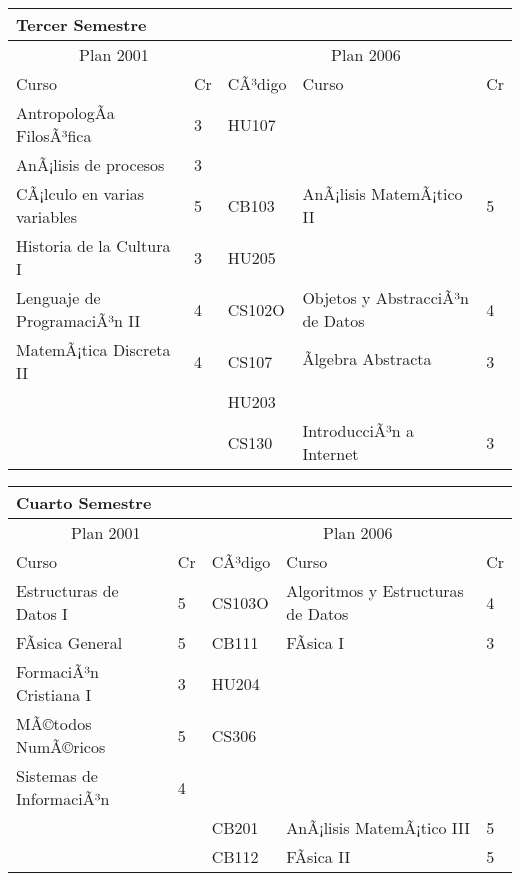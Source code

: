 \begin{center}
\begin{tabularx}{0.95\textwidth}{|p{4cm}|p{1cm}||p{2cm}|X|p{1cm}|}\hline
\multicolumn{5}{|l|}{\textbf{Tercer Semestre}} \\ \hline
\multicolumn{2}{|c|}{Plan 2001} & \multicolumn{3}{|c|}{Plan 2006} \\ \hline
Curso & Cr & CÃ³digo & Curso & Cr \\ \hline
AntropologÃ­a FilosÃ³fica & 3 & HU107 &  & \\ \hline
AnÃ¡lisis de procesos & 3 &  &  & \\ \hline
CÃ¡lculo en varias variables & 5 & CB103 & AnÃ¡lisis MatemÃ¡tico II & 5 \\ \hline
Historia de la Cultura I & 3 & HU205 &  & \\ \hline
Lenguaje de ProgramaciÃ³n II & 4 & CS102O & Objetos y AbstracciÃ³n de Datos & 4 \\ \hline
MatemÃ¡tica Discreta II & 4 & CS107 & Ãlgebra Abstracta & 3 \\ \hline
 &  & HU203 &  & \\ \hline
 &  & CS130 & IntroducciÃ³n a Internet & 3 \\ \hline
\end{tabularx}
\end{center}

\begin{center}
\begin{tabularx}{0.95\textwidth}{|p{4cm}|p{1cm}||p{2cm}|X|p{1cm}|}\hline
\multicolumn{5}{|l|}{\textbf{Cuarto Semestre}} \\ \hline
\multicolumn{2}{|c|}{Plan 2001} & \multicolumn{3}{|c|}{Plan 2006} \\ \hline
Curso & Cr & CÃ³digo & Curso & Cr \\ \hline
Estructuras de Datos I & 5 & CS103O & Algoritmos y Estructuras de Datos & 4 \\ \hline
FÃ­sica General & 5 & CB111 & FÃ­sica I & 3 \\ \hline
FormaciÃ³n Cristiana I & 3 & HU204 &  & \\ \hline
MÃ©todos NumÃ©ricos & 5 & CS306 &  & \\ \hline
Sistemas de InformaciÃ³n & 4 &  &  & \\ \hline
 &  & CB201 & AnÃ¡lisis MatemÃ¡tico III & 5 \\ \hline
 &  & CB112 & FÃ­sica II & 5 \\ \hline
\end{tabularx}
\end{center}

